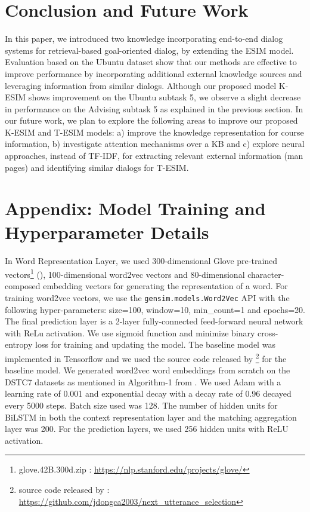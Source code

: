 \documentclass[letterpaper]{article} %
\begin{document}
\section{Conclusion and Future Work}
In this paper, we introduced two knowledge incorporating end-to-end dialog systems for retrieval-based goal-oriented dialog, by extending the ESIM model. Evaluation based on the Ubuntu dataset show that our methods are effective to improve performance by incorporating additional external knowledge sources and leveraging information from similar dialogs. Although our proposed model K-ESIM shows improvement on the Ubuntu subtask 5, we observe a slight decrease in performance on the Advising subtask 5 as explained in the previous section.  In our future work, we plan to explore the following areas to improve our proposed K-ESIM and T-ESIM models: a) improve the knowledge representation for course information, b) investigate attention mechanisms over a KB \cite{eric2017key} and c) explore neural approaches, instead of TF-IDF, for extracting relevant external information (man pages) and identifying similar dialogs for T-ESIM.

\section{Appendix: Model Training and Hyperparameter Details}
In Word Representation Layer, we used 300-dimensional Glove pre-trained vectors\footnote{glove.42B.300d.zip : \url{https://nlp.stanford.edu/projects/glove/}} (\cite{pennington2014glove}), 100-dimensional word2vec vectors \cite{mikolov2013efficient} and 80-dimensional character-composed embedding vectors for generating the representation of a word. For training word2vec vectors, we use the \texttt{gensim.models.Word2Vec} API with the following hyper-parameters: size=100, window=10, min\_count=1 and epochs=20. The final prediction layer is a 2-layer fully-connected feed-forward neural network with ReLu activation. We use sigmoid function and minimize binary cross-entropy loss for training and updating the model.  The baseline model was implemented in Tensorflow \cite{abadi2016tensorflow} and we used the source code released by \citeauthor{dong2018enhance} \footnote{source code released by \citeauthor{dong2018enhance} : \url{https://github.com/jdongca2003/next_utterance_selection}} for the baseline model. We generated word2vec word embeddings from scratch on the DSTC7 datasets as mentioned in Algorithm-1 from \citeauthor{dong2018enhance} . We used Adam \cite{kingma2014adam} with a learning rate of 0.001 and exponential decay with a decay rate of 0.96 decayed every 5000 steps. Batch size used was 128. The number of hidden units for BiLSTM in both the context representation layer and the matching aggregation layer was 200. For the prediction layers, we used 256 hidden units with ReLU activation.
\end{document}
